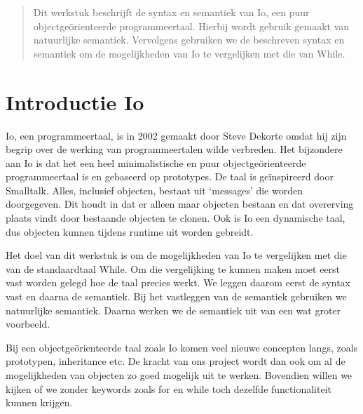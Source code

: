 \documentclass[12pt]{article}
\begin{document}
\maketitle

\begin{abstract}
Dit werkstuk beschrijft de syntax en semantiek van Io, een puur objectge\"orienteerde programmeertaal.
Hierbij wordt gebruik gemaakt van natuurlijke semantiek. Vervolgens gebruiken we de beschreven syntax en semantiek om
de mogelijkheden van Io te vergelijken met die van While.
\end{abstract}

\section{Introductie Io}
Io, een programmeertaal, is in 2002 gemaakt door Steve Dekorte omdat hij zijn begrip over de werking van programmeertalen wilde verbreden.
Het bijzondere aan Io is dat het een heel minimalistische en puur objectge\"orienteerde programmeertaal is en gebaseerd op prototypes. De taal is ge\"inspireerd door Smalltalk. Alles, inclusief objecten, bestaat uit `messages' die worden doorgegeven.
Dit houdt in dat er alleen maar objecten bestaan en dat overerving plaats vindt door bestaande objecten te clonen.
Ook is Io een dynamische taal, dus objecten kunnen tijdens runtime uit worden gebreidt.

Het doel van dit werkstuk is om de mogelijkheden van Io te vergelijken met die van de standaardtaal While.
Om die vergelijking te kunnen maken moet eerst vast worden gelegd hoe de taal precies werkt.
We leggen daarom eerst de syntax vast en daarna de semantiek. Bij het vastleggen van de semantiek gebruiken we natuurlijke semantiek.
Daarna werken we de semantiek uit van een wat groter voorbeeld.

Bij een objectge\"orienteerde taal zoals Io komen veel nieuwe concepten langs, zoals prototypen, inheritance etc. De kracht van ons project wordt dan ook om al de mogelijkheden van objecten 
zo goed mogelijk uit te werken.  Bovendien willen we kijken of we zonder keywords zoals for en while toch dezelfde functionaliteit kunnen krijgen.
\end{document}
